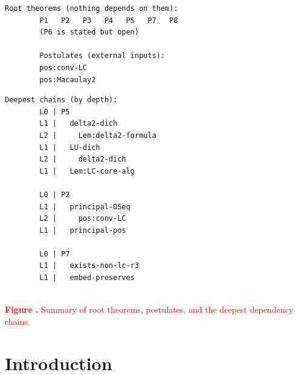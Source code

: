 \documentclass[11pt,reqno]{amsart}
\begin{document}
\begin{center}
\begin{minipage}[c]{0.50\linewidth}
		\vspace{0pt}
		\begin{Verbatim}[frame=single,framerule=0.7pt,
		rulecolor=\color{blue!60!black},framesep=8pt,
		fontsize=\fontsize{8}{9}\selectfont,
		formatcom=\color{red}\bfseries,
		xleftmargin=6pt,xrightmargin=6pt]
		Root theorems (nothing depends on them):
		P1   P2   P3   P4   P5   P7   P8
		(P6 is stated but open)

		Postulates (external inputs):
		pos:conv-LC
		pos:Macaulay2
		\end{Verbatim}
	\end{minipage}\hfill 
\begin{minipage}[c]{0.43\linewidth}
		\vspace{0pt}
		\begin{Verbatim}[frame=single,framerule=0.7pt,
		rulecolor=\color{blue!60!black},framesep=8pt,
		fontsize=\fontsize{8}{9}\selectfont,
		formatcom=\color{red}\bfseries,
		xleftmargin=6pt,xrightmargin=6pt]
		Deepest chains (by depth):
		L0 | P5
		L1 |   delta2-dich
		L2 |     Lem:delta2-formula
		L1 |   LU-dich
		L2 |     delta2-dich
		L1 |   Lem:LC-core-alg

		L0 | P2
		L1 |   principal-OSeq
		L2 |     pos:conv-LC
		L1 |   principal-pos

		L0 | P7
		L1 |   exists-non-lc-r3
		L1 |   embed-preserves
		\end{Verbatim}
	\end{minipage}

\medskip \noindent \text{ \ } \\[0pt]
{\small {}%
\textcolor{red}{\textbf{Figure \thefigure.}\enspace
			Summary of root theorems, postulates, and the deepest dependency
			chains.}} \label{fig:summary}
\end{center}

\newpage \pagestyle{plain}  

\section{Introduction}
\end{document}
